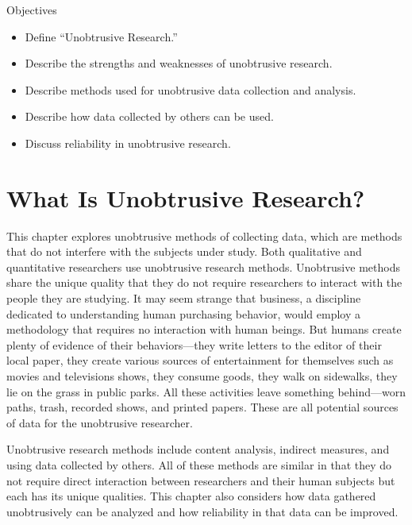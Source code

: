 \begin{center}
	\begin{objbox}{Objectives}
		\begin{itemize}
			\setlength{\itemsep}{0pt}
			\setlength{\parskip}{0pt}
			\setlength{\parsep}{0pt}
			
			\item Define ``Unobtrusive Research.''
			\item Describe the strengths and weaknesses of unobtrusive research.
			\item Describe methods used for unobtrusive data collection and analysis.
			\item Describe how data collected by others can be used.
			\item Discuss reliability in unobtrusive research.
		\end{itemize}
	\end{objbox}
\end{center}

\section{What Is Unobtrusive Research?}

This chapter explores unobtrusive methods of collecting data, which are methods that do not interfere with the subjects under study. Both qualitative and quantitative researchers use unobtrusive research methods. Unobtrusive methods share the unique quality that they do not require researchers to interact with the people they are studying. It may seem strange that business, a discipline dedicated to understanding human purchasing behavior, would employ a methodology that requires no interaction with human beings. But humans create plenty of evidence of their behaviors---they write letters to the editor of their local paper, they create various sources of entertainment for themselves such as movies and televisions shows, they consume goods, they walk on sidewalks, they lie on the grass in public parks. All these activities leave something behind---worn paths, trash, recorded shows, and printed papers. These are all potential sources of data for the unobtrusive researcher.

Unobtrusive research methods include content analysis, indirect measures, and using data collected by others. All of these methods are similar in that they do not require direct interaction between researchers and their human subjects but each has its unique qualities. This chapter also considers how data gathered unobtrusively can be analyzed and how reliability in that data can be improved.

